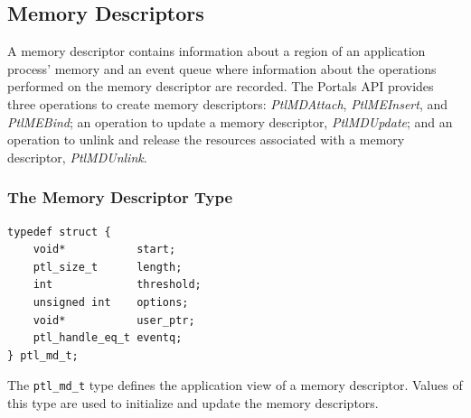 \documentclass{sand-report}
\begin{document}
\subsection{Memory Descriptors}\label{sec:md}

A memory descriptor contains information about a region of an
application process' memory and an event queue where information about
the operations performed on the memory descriptor are recorded.  The
Portals API provides three operations to create memory descriptors:
\emph{PtlMDAttach}, \emph{PtlMEInsert}, and \emph{PtlMEBind}; an
operation to update a memory descriptor, \emph{PtlMDUpdate}; and an
operation to unlink and release the resources associated with a memory
descriptor, \emph{PtlMDUnlink}.

\subsubsection{The Memory Descriptor Type}\label{sec:md-type}
\begin{verbatim}
typedef struct {
    void*           start;
    ptl_size_t      length;
    int             threshold;
    unsigned int    options;
    void*           user_ptr;
    ptl_handle_eq_t eventq;
} ptl_md_t;
\end{verbatim}

\noindent
The \texttt{ptl_md_t} type defines the application view of a memory
descriptor.  Values of this type are used to initialize and update the
memory descriptors.
\end{document}
